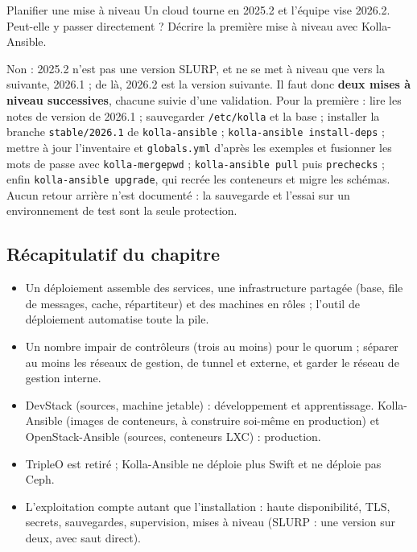 \begin{exercice}{Planifier une mise à niveau}\label{ex:dep-niveau}
Un cloud tourne en 2025.2 et l'équipe vise 2026.2. Peut-elle y passer directement ? Décrire la première mise à niveau avec
Kolla-Ansible.
\end{exercice}
\begin{correction}
Non : 2025.2 n'est pas une version SLURP, et ne se met à niveau que vers la suivante, 2026.1 ; de là, 2026.2 est la version
suivante. Il faut donc \textbf{deux mises à niveau successives}, chacune suivie d'une validation. Pour la première : lire les notes
de version de 2026.1 ; sauvegarder \texttt{/etc/kolla} et la base ; installer la branche \texttt{stable/2026.1} de
\texttt{kolla-ansible} ; \texttt{kolla-ansible install-deps} ; mettre à jour l'inventaire et \texttt{globals.yml} d'après les
exemples et fusionner les mots de passe avec \texttt{kolla-mergepwd} ; \texttt{kolla-ansible pull} puis \texttt{prechecks} ; enfin
\texttt{kolla-ansible upgrade}, qui recrée les conteneurs et migre les schémas. Aucun retour arrière n'est documenté : la
sauvegarde et l'essai sur un environnement de test sont la seule protection.
\end{correction}

\subsection{Récapitulatif du chapitre}\label{sec:dep-recap}

\begin{aretenir}
\begin{itemize}
  \item Un déploiement assemble des services, une infrastructure partagée (base, file de messages, cache, répartiteur) et des
        machines en rôles ; l'outil de déploiement automatise toute la pile.
  \item Un nombre impair de contrôleurs (trois au moins) pour le quorum ; séparer au moins les réseaux de gestion, de tunnel et
        externe, et garder le réseau de gestion interne.
  \item DevStack (sources, machine jetable) : développement et apprentissage. Kolla-Ansible (images de conteneurs, à construire
        soi-même en production) et OpenStack-Ansible (sources, conteneurs LXC) : production.
  \item TripleO est retiré ; Kolla-Ansible ne déploie plus Swift et ne déploie pas Ceph.
  \item L'exploitation compte autant que l'installation : haute disponibilité, TLS, secrets, sauvegardes, supervision, mises à
        niveau (SLURP : une version sur deux, avec saut direct).
\end{itemize}
\end{aretenir}

